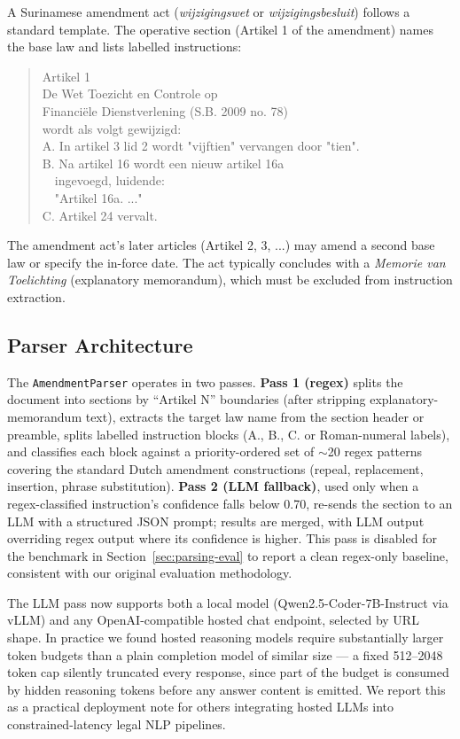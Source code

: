 \documentclass{IOS-Book-Article}
\begin{document}
A Surinamese amendment act (\emph{wijzigingswet} or \emph{wijzigingsbesluit}) follows a standard
template. The operative section (Artikel 1 of the amendment) names the base law and lists
labelled instructions:

\begin{quote}
\small\ttfamily
Artikel 1\\
De Wet Toezicht en Controle op\\
Financi\"{e}le Dienstverlening (S.B. 2009 no. 78)\\
wordt als volgt gewijzigd:\\[4pt]
A. In artikel 3 lid 2 wordt "vijftien" vervangen door "tien".\\
B. Na artikel 16 wordt een nieuw artikel 16a\\
\ \ ingevoegd, luidende:\\
\ \ "Artikel 16a. ..."\\
C. Artikel 24 vervalt.
\end{quote}

The amendment act's later articles (Artikel 2, 3, ...) may amend a second base law or
specify the in-force date. The act typically concludes with a \emph{Memorie van Toelichting}
(explanatory memorandum), which must be excluded from instruction extraction.

\subsection{Parser Architecture}

The \texttt{AmendmentParser} operates in two passes. \textbf{Pass 1 (regex)} splits the document into
sections by ``Artikel N'' boundaries (after stripping explanatory-memorandum text), extracts
the target law name from the section header or preamble, splits labelled instruction blocks
(A., B., C. or Roman-numeral labels), and classifies each block against a priority-ordered
set of $\sim$20 regex patterns covering the standard Dutch amendment constructions (repeal,
replacement, insertion, phrase substitution). \textbf{Pass 2 (LLM fallback)}, used only when a
regex-classified instruction's confidence falls below 0.70, re-sends the section to an LLM
with a structured JSON prompt; results are merged, with LLM output overriding regex output
where its confidence is higher. This pass is disabled for the benchmark in Section~\ref{sec:parsing-eval} to
report a clean regex-only baseline, consistent with our original evaluation methodology.

The LLM pass now supports both a local model (Qwen2.5-Coder-7B-Instruct via vLLM) and any
OpenAI-compatible hosted chat endpoint, selected by URL shape. In practice we found hosted
reasoning models require substantially larger token budgets than a plain completion model of
similar size --- a fixed 512--2048 token cap silently truncated every response, since part of
the budget is consumed by hidden reasoning tokens before any answer content is emitted. We
report this as a practical deployment note for others integrating hosted LLMs into
constrained-latency legal NLP pipelines.
\end{document}
